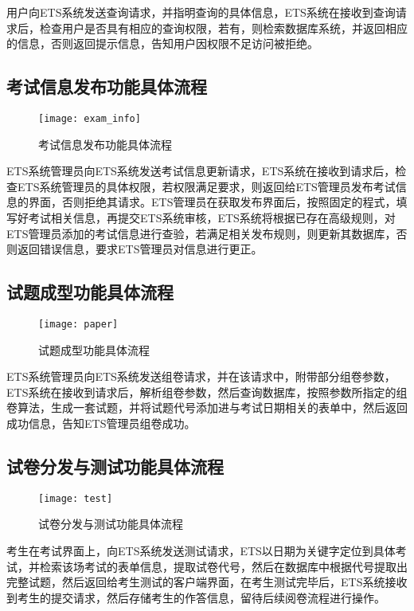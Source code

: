 用户向ETS系统发送查询请求，并指明查询的具体信息，ETS系统在接收到查询请求后，检查用户是否具有相应的查询权限，若有，则检索数据库系统，并返回相应的信息，否则返回提示信息，告知用户因权限不足访问被拒绝。

\subsection{考试信息发布功能具体流程}
\begin{figure}[ht]
\centering
\texttt{[image: exam\_info]}
\caption{考试信息发布功能具体流程} \label{fig:figure7}
\end{figure}

ETS系统管理员向ETS系统发送考试信息更新请求，ETS系统在接收到请求后，检查ETS系统管理员的具体权限，若权限满足要求，则返回给ETS管理员发布考试信息的界面，否则拒绝其请求。ETS管理员在获取发布界面后，按照固定的程式，填写好考试相关信息，再提交ETS系统审核，ETS系统将根据已存在高级规则，对ETS管理员添加的考试信息进行查验，若满足相关发布规则，则更新其数据库，否则返回错误信息，要求ETS管理员对信息进行更正。

\subsection{试题成型功能具体流程}
\begin{figure}[ht]
\centering
\texttt{[image: paper]}
\caption{试题成型功能具体流程} \label{fig:figure8}
\end{figure}

ETS系统管理员向ETS系统发送组卷请求，并在该请求中，附带部分组卷参数，ETS系统在接收到请求后，解析组卷参数，然后查询数据库，按照参数所指定的组卷算法，生成一套试题，并将试题代号添加进与考试日期相关的表单中，然后返回成功信息，告知ETS管理员组卷成功。

\subsection{试卷分发与测试功能具体流程}
\begin{figure}[ht]
\centering
\texttt{[image: test]}
\caption{试卷分发与测试功能具体流程} \label{fig:figure9}
\end{figure}

考生在考试界面上，向ETS系统发送测试请求，ETS以日期为关键字定位到具体考试，并检索该场考试的表单信息，提取试卷代号，然后在数据库中根据代号提取出完整试题，然后返回给考生测试的客户端界面，在考生测试完毕后，ETS系统接收到考生的提交请求，然后存储考生的作答信息，留待后续阅卷流程进行操作。


